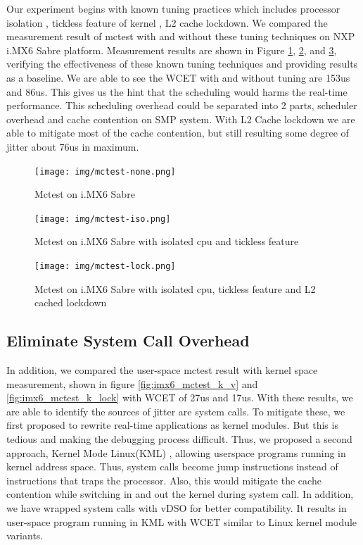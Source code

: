 \documentclass[conference]{IEEEtran}
\begin{document}
    Our experiment begins with known tuning practices which includes processor isolation \cite{isolatedcpu}, tickless
    feature of kernel \cite{tickless}, L2 cache lockdown. We compared the measurement result of mctest with and without
    these tuning techniques on NXP i.MX6 Sabre platform. Measurement results are shown in
    Figure \ref{fig:imx6_mctest_v}, \ref{fig:imx6_mctest_iso}, and \ref{fig:imx6_mctest_lock}, verifying the effectiveness of
    these known tuning techniques and providing results as a baseline. We are able to see the WCET with and without
    tuning are 153us and 86us. This gives us the hint that the scheduling would harms the real-time performance. This
    scheduling overhead could be separated into 2 parts, scheduler overhead and cache contention on SMP system. With L2
    Cache lockdown we are able to mitigate most of the cache contention, but still resulting some degree of jitter about
    76us in maximum.

    \begin{figure} \centering \texttt{[image: img/mctest-none.png]} \caption{Mctest on i.MX6 Sabre}
    \label{fig:imx6_mctest_v} \end{figure}
    
    \begin{figure} \centering \texttt{[image: img/mctest-iso.png]} \caption{Mctest on i.MX6 Sabre with
    isolated cpu and tickless feature} \label{fig:imx6_mctest_iso} \end{figure}
    
    \begin{figure} \centering \texttt{[image: img/mctest-lock.png]} \caption{Mctest on i.MX6 Sabre with
    isolated cpu, tickless feature and L2 cached lockdown} \label{fig:imx6_mctest_lock} \end{figure}
    
    \subsection{Eliminate System Call Overhead}

    In addition, we compared the user-space mctest result with kernel space measurement, shown in figure
    \ref{fig:imx6_mctest_k_v} and \ref{fig:imx6_mctest_k_lock} with WCET of 27us and 17us. With these results, we are
    able to identify the sources of jitter are system calls. To mitigate these, we first proposed to rewrite real-time
    applications as kernel modules. But this is tedious and making the debugging process difficult. Thus, we proposed a
    second approach, Kernel Mode Linux(KML) \cite{KML} \cite{KMLConf}, allowing userspace programs running in kernel
    address space. Thus, system calls become jump instructions instead of instructions that traps the processor. Also,
    this would mitigate the cache contention while switching in and out the kernel during system call.
    In addition, we have wrapped system calls with vDSO \cite{vDSO} for better compatibility. It results in
    user-space program running in KML with WCET similar to Linux kernel module variants.
\end{document}
